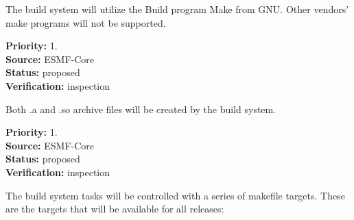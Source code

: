 

The build system will utilize the Build program Make from
GNU.  Other vendors' make programs will not be supported.
\begin{reqlist}
{\bf Priority:} 1. \\
{\bf Source:} ESMF-Core \\
{\bf Status:} proposed \\
{\bf Verification:} inspection
\end{reqlist}

Both .a and .so archive files will be created by the 
build system.
\begin{reqlist}
{\bf Priority:} 1. \\
{\bf Source:} ESMF-Core \\
{\bf Status:}  proposed \\
{\bf Verification:} inspection
\end{reqlist}

The build system tasks will be controlled with a series of
makefile targets. These are the targets that will be available
for all releases:

